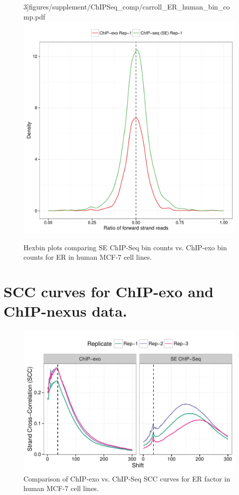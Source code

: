 \documentclass{article}
\newcommand{\RW}[1]{\textcolor{blue}{RW: #1}}
\begin{document}
\begin{figure}[H]
  3]{figures/supplement/ChIPSeq_comp/carroll_ER_human_bin_comp.pdf}
  \includegraphics[width = .35\textwidth,page =
  3]{figures/supplement/ChIPSeq_comp/ER_imbalance.pdf}
  \caption{Hexbin plots comparing SE ChIP-Seq bin counts vs. ChIP-exo
    bin counts for ER in human MCF-7 cell lines. }
  \label{sfig:comp3}
\end{figure}



\newpage

\section{SCC curves for ChIP-exo and ChIP-nexus data.}

\begin{figure}[H]
  \centering
  \includegraphics[width =
  .7\textwidth]{figures/supplement/SCC/Carroll_human_SCC.pdf}
  \caption{Comparison of ChIP-exo vs. ChIP-Seq SCC curves for ER factor in
    human MCF-7 cell lines. }
\label{sfig:scc1}
\end{figure}
\end{document}
